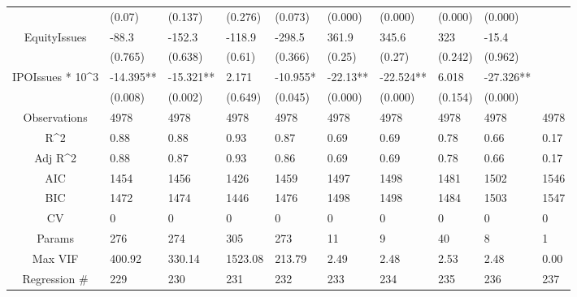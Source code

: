 \documentclass{article}
\begin{document}
\begin{table}[H]
\begin{tabular}{|clllllllll|}
   & (0.07) & (0.137) & (0.276) & (0.073) & (0.000) & (0.000) & (0.000) & (0.000) &  \\ 
  EquityIssues & -88.3 & -152.3 & -118.9 & -298.5 & 361.9 & 345.6 & 323 & -15.4 &  \\ 
   & (0.765) & (0.638) & (0.61) & (0.366) & (0.25) & (0.27) & (0.242) & (0.962) &  \\ 
  IPOIssues * 10^3 & -14.395** & -15.321** & 2.171 & -10.955* & -22.13** & -22.524** & 6.018 & -27.326** &  \\ 
   & (0.008) & (0.002) & (0.649) & (0.045) & (0.000) & (0.000) & (0.154) & (0.000) &  \\ 
  \hline 
 Observations & 4978 & 4978 & 4978 & 4978 & 4978 & 4978 & 4978 & 4978 & 4978 \\ 
  R^2 & 0.88 & 0.88 & 0.93 & 0.87 & 0.69 & 0.69 & 0.78 & 0.66 & 0.17 \\ 
  Adj R^2 & 0.88 & 0.87 & 0.93 & 0.86 & 0.69 & 0.69 & 0.78 & 0.66 & 0.17 \\ 
  AIC & 1454 & 1456 & 1426 & 1459 & 1497 & 1498 & 1481 & 1502 & 1546 \\ 
  BIC & 1472 & 1474 & 1446 & 1476 & 1498 & 1498 & 1484 & 1503 & 1547 \\ 
  CV & 0 & 0 & 0 & 0 & 0 & 0 & 0 & 0 & 0 \\ 
  Params & 276 & 274 & 305 & 273 & 11 & 9 & 40 & 8 & 1 \\ 
  Max VIF & 400.92 & 330.14 & 1523.08 & 213.79 & 2.49 & 2.48 & 2.53 & 2.48 & 0.00 \\ 
  Regression \# & 229 & 230 & 231 & 232 & 233 & 234 & 235 & 236 & 237 \\ 
   \hline
\end{tabular}
 
\end{table}
\end{document}

